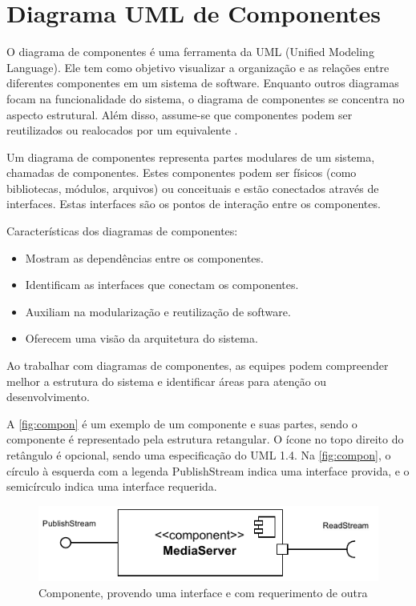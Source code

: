 \documentclass[12pt, %
openright, 
oneside, %
a4paper,    %
brazil]{facom-ufu-abntex2}
\begin{document}
\section{Diagrama UML de Componentes}

O diagrama de componentes é uma ferramenta da UML (Unified Modeling Language).
Ele tem como objetivo visualizar a organização e as relações entre diferentes
componentes em um sistema de software. Enquanto outros diagramas focam na
funcionalidade do sistema, o diagrama de componentes se concentra no aspecto
estrutural. Além disso, assume-se que componentes podem ser reutilizados ou
realocados por um equivalente \cite{UMLComponentDiagrams2023}.

Um diagrama de componentes representa partes modulares de um sistema, chamadas
de componentes. Estes componentes podem ser físicos (como bibliotecas, módulos,
arquivos) ou conceituais e estão conectados através de interfaces. Estas
interfaces são os pontos de interação entre os componentes.

Características dos diagramas de componentes:
\begin{itemize}
	\item Mostram as dependências entre os componentes.
	\item Identificam as interfaces que conectam os componentes.
	\item Auxiliam na modularização e reutilização de software.
	\item Oferecem uma visão da arquitetura do sistema.
\end{itemize}

Ao trabalhar com diagramas de componentes, as equipes podem compreender melhor
a estrutura do sistema e identificar áreas para atenção ou desenvolvimento.

A \autoref{fig:compon} é um exemplo de um componente e suas partes, sendo o
componente é representado pela estrutura retangular. O ícone no topo direito do
retângulo é opcional, sendo uma especificação do UML 1.4. Na
\autoref{fig:compon}, o círculo à esquerda com a legenda PublishStream indica
uma interface provida, e o semicírculo indica uma interface requerida.


\begin{figure}[!ht]
	\centering
	\includegraphics[width=0.8\linewidth]{example_diagram.pdf}
	\caption[Componente de exemplo]{Componente, provendo uma interface e
		com requerimento de outra}
	\label{fig:compon}
\end{figure}
\end{document}
